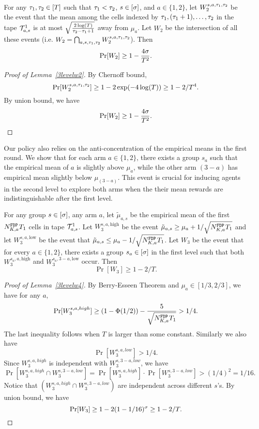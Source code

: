\begin{lemma}\label{3levelw2}
  For any $\tau_1, \tau_2\in [T]$ such that $\tau_1 < \tau_2$, $s\in [\sigma]$, and
  $a\in \{1,2\}$, let $W_2^{s,a,\tau_1,\tau_2}$ be the event that the mean
  among the cells indexed by $\tau_1, (\tau_1+1), \ldots, \tau_2$ in the tape
  $\mathcal{T}^1_{a, s}$ is at most $\sqrt{\frac{2\log(T)}{\tau_2-\tau_1+1}}$ away
  from $\mu_a$.  Let $W_2$ be the intersection of all these events
  (i.e.  $W_2 = \bigcap_{a,s,\tau_1,\tau_2} W_2^{s,a,\tau_1,\tau_2}$). Then
  \[
    \Pr[W_2] \geq 1- \frac{4\sigma}{T^2}.
  \]
\end{lemma}


\begin{proof}[Proof of Lemma~\ref{3levelw2}]
  By Chernoff bound,
\[
\Pr[W_2^{s,a,\tau_1,\tau_2}] \geq 1 - 2\exp(-4\log(T)) \geq 1- 2/T^4.
\]
By union bound, we have
\[
\Pr[W_2] \geq 1- \frac{4\sigma}{T^2}.
\]
\end{proof}

Our policy also relies on the anti-concentration of the empirical
means in the first round. We show that for each arm $a\in \{1, 2\}$,
there exists a group $s_a$ such that the empirical mean of $a$ is
slightly above $\mu_a$, while the other arm $(3 - a)$ has empirical
mean slightly below $\mu_{(3-a)}$. This event is crucial for inducing
agents in the second level to explore both arms when the their
mean rewards are indistinguishable after the first level.


\begin{lemma}\label{3levelw4}
  For any group $s\in [\sigma]$, any arm $a$, let $\tilde\mu_{a,s}$ be the
  empirical mean of the first $N^\mathtt{FDP}_{K,a}  T_1$ cells in tape $\mathcal{T}^1_{a, s}$.
  Let $W_3^{s,a,\text{high}}$ be the event
  $\tilde\mu_{a, s} \geq \mu_a + 1/\sqrt{N^\mathtt{FDP}_{K,a}  T_1}$ and let
  $W_3^{s,a,\text{low}}$ be the event that
  $\tilde\mu_{a, s} \leq \mu_a - 1/\sqrt{N^\mathtt{FDP}_{K,a}  T_1}$.  Let $W_3$ be the
  event that for every $a\in \{1, 2\}$, there exists a group
  $s_a\in [\sigma]$ in the first level such that both $W_3^{s_a,a,\text{high}}$
  and $W_3^{s_a,3-a,\text{low}}$ occur. Then
  \[
    \Pr[W_3]\geq 1 -2 /T.
  \]
\end{lemma}



\begin{proof}[Proof of Lemma~\ref{3levelw4}]
By Berry-Esseen Theorem and
  $\mu_a \in [1/3,2/3]$, we have for any $a$,
\[
\Pr[W_3^{s,a,high}] \geq (1-\Phi(1/2)) - \frac{5}{\sqrt{N^\mathtt{FDP}_{K,a} T_1}} > 1/4.
\]
The last inequality follows when $T$ is larger than some constant.
Similarly we also have
\[
\Pr[W_3^{s,a,low}] > 1/4.
\]
Since $W_3^{s,a,high}$ is independent with $W_3^{s,3-a,low}$, we have
\[
\Pr[W_3^{s,a,high} \cap W_3^{s,3-a,low}] =\Pr[W_3^{s,a,high}] \cdot  \Pr[W_3^{s,3-a,low}]>(1/4)^2 = 1/16.
\]
Notice that $(W_3^{s,a,high} \cap W_3^{s,3-a,low})$ are independent
across different $s$'s. By union bound, we have
\[
\Pr[W_3] \geq 1- 2(1-1/16)^\sigma \geq 1 -2 /T.
\]
\end{proof}



